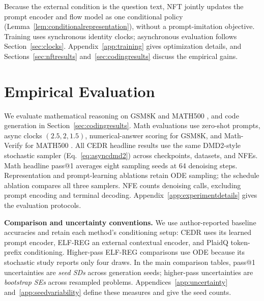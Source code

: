 \documentclass[11pt,letterpaper]{article}
\begin{document}
Because the external condition is the question text, NFT jointly updates the prompt encoder and flow model as one conditional policy (Lemma~\ref{lem:conditionalrepresentation}), without a prompt-imitation objective. Training uses synchronous identity clocks; asynchronous evaluation follows Section~\ref{sec:clocks}. Appendix~\ref{app:training} gives optimization details, and Sections~\ref{sec:nftresults} and~\ref{sec:codingresults} discuss the empirical gains.

\section{Empirical Evaluation}
\label{sec:headlineresults}

We evaluate mathematical reasoning on GSM8K and MATH500 \citep{gsm8k,math,math500}, and code generation in Section~\ref{sec:codingresults}. Math evaluations use zero-shot prompts, async clocks $(2.5,2,1.5)$, numerical-answer scoring for GSM8K, and Math-Verify for MATH500 \citep{mathverify}. All CEDR headline results use the same DMD2-style stochastic sampler (Eq.~\eqref{eq:asyncdmd2}) across checkpoints, datasets, and NFEs. Math headline pass@1 averages eight sampling seeds at 64 denoising steps. Representation and prompt-learning ablations retain ODE sampling; the schedule ablation compares all three samplers. NFE counts denoising calls, excluding prompt encoding and terminal decoding. Appendix~\ref{app:experimentdetails} gives the evaluation protocols.

\textbf{Comparison and uncertainty conventions.}
We use author-reported baseline accuracies and retain each method's conditioning setup: CEDR uses its learned prompt encoder, ELF-REG an external contextual encoder, and PlaidQ token-prefix conditioning. Higher-pass ELF-REG comparisons use ODE because its stochastic study reports only four draws. In the main comparison tables, pass@1 uncertainties are \emph{seed SDs} across generation seeds; higher-pass uncertainties are \emph{bootstrap SEs} across resampled problems. Appendices~\ref{app:uncertainty} and~\ref{app:seedvariability} define these measures and give the seed counts.
\end{document}
